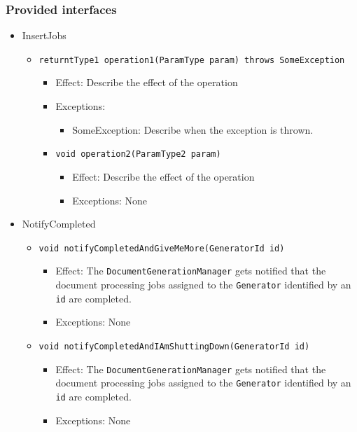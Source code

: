 \documentclass[a4paper,10pt]{article}
\begin{document}
\subsubsection*{Provided interfaces}
\begin{itemize}
    \item InsertJobs
    \begin{itemize}
        \item \texttt{returntType1 operation1(ParamType param) throws SomeException}
        \begin{itemize}
            \item Effect: Describe the effect of the operation
            \item Exceptions:
            \begin{itemize}
                \item SomeException: Describe when the exception is thrown.
            \end{itemize}

            \item \texttt{void operation2(ParamType2 param)}
            \begin{itemize}
                \item Effect: Describe the effect of the operation
                \item Exceptions: None
            \end{itemize}
        \end{itemize}
    \end{itemize}

    \item NotifyCompleted
    \begin{itemize}
        \item \texttt{void notifyCompletedAndGiveMeMore(GeneratorId id)}
        \begin{itemize}
            \item Effect: The \texttt{DocumentGenerationManager} gets notified that the document processing jobs assigned to the \texttt{Generator} identified by an \texttt{id} are completed. 
            \item Exceptions: None
        \end{itemize}
        
        \item \texttt{void notifyCompletedAndIAmShuttingDown(GeneratorId id)}
            \begin{itemize}
                \item Effect: The \texttt{DocumentGenerationManager} gets notified that the document processing jobs assigned to the \texttt{Generator} identified by an \texttt{id} are completed. 
                \item Exceptions: None
            \end{itemize}
        \end{itemize}
    \end{itemize}
\end{document}
